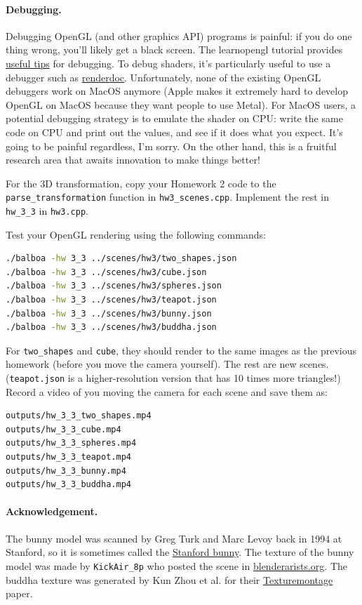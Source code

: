 \paragraph{Debugging.} Debugging OpenGL (and other graphics API) programs is painful: if you do one thing wrong, you'll likely get a black screen. The learnopengl tutorial provides \href{https://learnopengl.com/In-Practice/Debugging}{useful tips} for debugging. To debug shaders, it's particularly useful to use a debugger such as \href{https://renderdoc.org/}{renderdoc}. Unfortunately, none of the existing OpenGL debuggers work on MacOS anymore (Apple makes it extremely hard to develop OpenGL on MacOS because they want people to use Metal). For MacOS users, a potential debugging strategy is to emulate the shader on CPU: write the same code on CPU and print out the values, and see if it does what you expect. It's going to be painful regardless, I'm sorry. On the other hand, this is a fruitful research area that awaits innovation to make things better!

For the 3D transformation, copy your Homework 2 code to the \lstinline{parse_transformation} function in \lstinline{hw3_scenes.cpp}. Implement the rest in \lstinline{hw_3_3} in \lstinline{hw3.cpp}.

Test your OpenGL rendering using the following commands:
\begin{lstlisting}[language=bash]
./balboa -hw 3_3 ../scenes/hw3/two_shapes.json
./balboa -hw 3_3 ../scenes/hw3/cube.json
./balboa -hw 3_3 ../scenes/hw3/spheres.json
./balboa -hw 3_3 ../scenes/hw3/teapot.json
./balboa -hw 3_3 ../scenes/hw3/bunny.json
./balboa -hw 3_3 ../scenes/hw3/buddha.json
\end{lstlisting}

For \lstinline{two_shapes} and \lstinline{cube}, they should render to the same images as the previous homework (before you move the camera yourself). The rest are new scenes. (\lstinline{teapot.json} is a higher-resolution version that has 10 times more triangles!) Record a video of you moving the camera for each scene and save them as:
\begin{lstlisting}[language=bash]
outputs/hw_3_3_two_shapes.mp4
outputs/hw_3_3_cube.mp4
outputs/hw_3_3_spheres.mp4
outputs/hw_3_3_teapot.mp4
outputs/hw_3_3_bunny.mp4
outputs/hw_3_3_buddha.mp4
\end{lstlisting}

\paragraph{Acknowledgement.} The bunny model was scanned by Greg Turk and Marc Levoy back in 1994 at Stanford, so it is sometimes called the \href{https://en.wikipedia.org/wiki/Stanford_bunny}{Stanford bunny}. The texture of the bunny model was made by \lstinline{KickAir_8p} who posted the scene in \href{https://blenderartists.org/t/uv-unwrapped-stanford-bunny-happy-spring-equinox/1101297}{blenderarists.org}. The buddha texture was generated by Kun Zhou et al. for their \href{http://kunzhou.net/tex-models.htm}{Texturemontage} paper.

